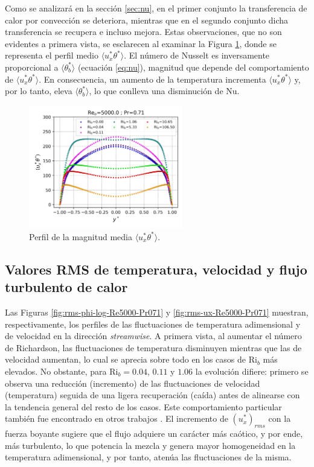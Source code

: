 Como se analizará en la sección \ref{sec:nu}, en el primer conjunto la transferencia de calor por convección se deteriora, mientras que en el segundo conjunto dicha transferencia se recupera e incluso mejora. Estas observaciones, que no son evidentes a primera vista, se esclarecen al examinar la Figura \ref{fig:uphi-Re5000-Pr071}, donde se representa el perfil medio $\langle u_x^{*}\theta^{*}\rangle$. El número de Nusselt es inversamente proporcional a $\langle\theta^{*}_b\rangle$ (ecuación \ref{eq:nu}), magnitud que depende del comportamiento de $\langle u_x^{*}\theta^{*}\rangle$. En consecuencia, un aumento de la temperatura incrementa $\langle u_x^{*}\theta^{*}\rangle$ y, por lo tanto, eleva $\langle\theta^{*}_b\rangle$, lo que conlleva una disminución de Nu.

\begin{figure}[H] %
  \centering
  \includegraphics[width=0.6\textwidth]{figures/cap5/Re5000-Pr071/uphi_profile.png}
  \caption{Perfil de la magnitud media $\langle u^{*}_x\theta^{*}\rangle$.}
  \label{fig:uphi-Re5000-Pr071}
\end{figure}




\subsection{Valores RMS de temperatura, velocidad y flujo turbulento de calor} 

Las Figuras \ref{fig:rms-phi-log-Re5000-Pr071} y \ref{fig:rms-ux-Re5000-Pr071} muestran, respectivamente, los perfiles de las fluctuaciones de temperatura adimensional y de velocidad en la dirección \textit{streamwise}. A primera vista, al aumentar el número de Richardson, las fluctuaciones de temperatura disminuyen mientras que las de velocidad aumentan, lo cual se aprecia sobre todo en los casos de Ri$_b$ más elevados. No obstante, para Ri$_b = 0{.}04$, $0{.}11$ y $1{.}06$ la evolución difiere: primero se observa una reducción (incremento) de las fluctuaciones de velocidad (temperatura) seguida de una ligera recuperación (caída) antes de alinearse con la tendencia general del resto de los casos. Este comportamiento particular también fue encontrado en otros trabajos \cite{you2003direct,carr1973velocity}. El incremento de $(u_x^*)_{rms}$ con la fuerza boyante sugiere que el flujo adquiere un carácter más caótico, y por ende, más turbulento, lo que potencia la mezcla y genera mayor homogeneidad en la temperatura adimensional, y por tanto, atenúa las fluctuaciones de la misma.

